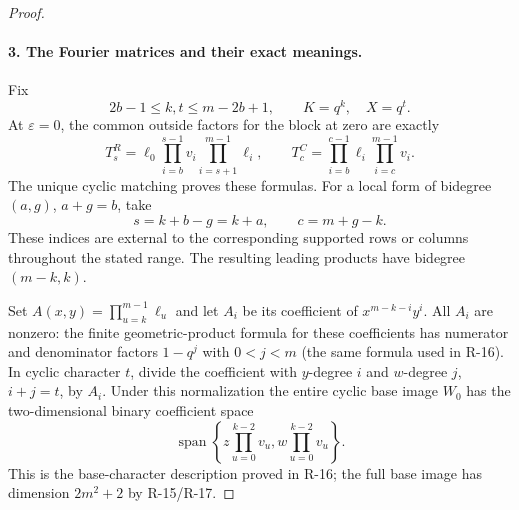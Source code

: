 \documentclass[11pt,a4paper]{article}
\theoremstyle{definition}\newtheorem{definition}{Definition}
\begin{document}
\begin{proof}
\paragraph{3. The Fourier matrices and their exact meanings.}
Fix
\[
 2b-1\leq k,t\leq m-2b+1,\qquad K=q^k,\quad X=q^t.
\]
At $\varepsilon=0$, the common outside factors for the block at zero
are exactly
\begin{equation}\label{R22:outside}
 T_s^R=\ell_0\prod_{i=b}^{s-1}v_i\prod_{i=s+1}^{m-1}\ell_i,
 \qquad
 T_c^C=\prod_{i=b}^{c-1}\ell_i\prod_{i=c}^{m-1}v_i.
\end{equation}
The unique cyclic matching proves these formulas. For a local form
of bidegree $(a,g)$, $a+g=b$, take
\begin{equation}\label{R22:alignment}
 s=k+b-g=k+a,\qquad c=m+g-k.
\end{equation}
These indices are external to the corresponding supported rows or
columns throughout the stated range. The resulting leading products
have bidegree $(m-k,k)$.

Set $A(x,y)=\prod_{u=k}^{m-1}\ell_u$ and let $A_i$ be its coefficient
of $x^{m-k-i}y^i$. All $A_i$ are nonzero: the finite geometric-product
formula for these coefficients has numerator and denominator factors
$1-q^j$ with $0<j<m$ (the same formula used in R-16).
In cyclic character $t$, divide the coefficient with $y$-degree $i$
and $w$-degree $j$, $i+j=t$, by $A_i$.
Under this normalization the entire cyclic base image $W_0$ has the
two-dimensional binary coefficient space
\begin{equation}\label{R22:base}
 \operatorname{span}\left\{
 z\prod_{u=0}^{k-2}v_u,
 w\prod_{u=0}^{k-2}v_u\right\}.
\end{equation}
This is the base-character description proved in R-16; the full base
image has dimension $2m^2+2$ by R-15/R-17.


\end{proof}
\end{document}
